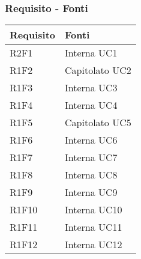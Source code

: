 \subsubsection{Requisito - Fonti}
\begin{center}
	\begin{longtable}{|p{22mm}|p{44mm}|}
		\hline
		\rowcolor{lighter-grayer}
		\textbf{Requisito} &  \textbf{Fonti}  \\
		\hline
		\endhead
		


 R2F1 &
Interna \newline
UC1 
\\
\hline

R1F2 &
Capitolato \newline
UC2 
\\
\hline

R1F3 &
Interna \newline
UC3 
\\
\hline

R1F4 &
Interna \newline
UC4 
\\
\hline

R1F5 &
Capitolato \newline
UC5 
\\
\hline

R1F6 &
Interna \newline
UC6 
\\
\hline

R1F7 &
Interna \newline
UC7 
\\
\hline

R1F8 &
Interna \newline
UC8 
\\
\hline

R1F9 &
Interna \newline
UC9 
\\
\hline

R1F10 &
Interna \newline
UC10 
\\
\hline

R1F11 &
Interna \newline
UC11 
\\
\hline

R1F12 &
Interna \newline
UC12 
\\
\hline


\end{longtable}
\end{center}
